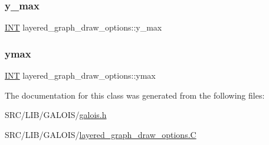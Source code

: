 \mbox{\label{classlayered__graph__draw__options_a669e7c5208f3fbe5f60b8bc57ee0af54}} 
\subsubsection{\texorpdfstring{y\+\_\+max}{y\_max}}
{\footnotesize\ttfamily \mbox{\hyperlink{galois_8h_a09fddde158a3a20bd2dcadb609de11dc}{I\+NT}} layered\+\_\+graph\+\_\+draw\+\_\+options\+::y\+\_\+max}

\mbox{\label{classlayered__graph__draw__options_ab215f81a17d28946eec9b5aacde56e74}} 
\subsubsection{\texorpdfstring{ymax}{ymax}}
{\footnotesize\ttfamily \mbox{\hyperlink{galois_8h_a09fddde158a3a20bd2dcadb609de11dc}{I\+NT}} layered\+\_\+graph\+\_\+draw\+\_\+options\+::ymax}



The documentation for this class was generated from the following files\+:\begin{DoxyCompactItemize}
\item 
S\+R\+C/\+L\+I\+B/\+G\+A\+L\+O\+I\+S/\mbox{\hyperlink{galois_8h}{galois.\+h}}\item 
S\+R\+C/\+L\+I\+B/\+G\+A\+L\+O\+I\+S/\mbox{\hyperlink{layered__graph__draw__options_8_c}{layered\+\_\+graph\+\_\+draw\+\_\+options.\+C}}\end{DoxyCompactItemize}
